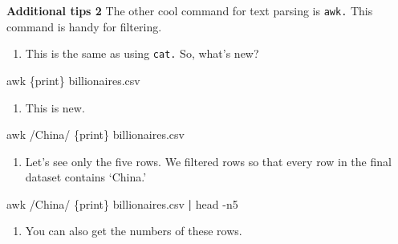 \documentclass[
]{book}
\newenvironment{Shaded}{\begin{snugshade}}{\end{snugshade}}
\newcommand{\FunctionTok}[1]{\textcolor[rgb]{0.00,0.00,0.00}{#1}}
\newcommand{\KeywordTok}[1]{\textcolor[rgb]{0.13,0.29,0.53}{\textbf{#1}}}
\newcommand{\NormalTok}[1]{#1}
\newcommand{\StringTok}[1]{\textcolor[rgb]{0.31,0.60,0.02}{#1}}
\providecommand{\tightlist}{%
  \setlength{\itemsep}{0pt}\setlength{\parskip}{0pt}}
\begin{document}
\textbf{Additional tips 2}
The other cool command for text parsing is \texttt{awk.} This command is handy for filtering.

\begin{enumerate}
\def\labelenumi{\arabic{enumi}.}
\tightlist
\item
  This is the same as using \texttt{cat.} So, what's new?
\end{enumerate}

\begin{Shaded}
\begin{Highlighting}[]
\FunctionTok{awk} \StringTok{\textquotesingle{}\{print\}\textquotesingle{}}\NormalTok{ billionaires.csv }
\end{Highlighting}
\end{Shaded}

\begin{enumerate}
\def\labelenumi{\arabic{enumi}.}
\setcounter{enumi}{1}
\tightlist
\item
  This is new.
\end{enumerate}

\begin{Shaded}
\begin{Highlighting}[]
\FunctionTok{awk} \StringTok{\textquotesingle{}/China/ \{print\}\textquotesingle{}}\NormalTok{ billionaires.csv}
\end{Highlighting}
\end{Shaded}

\begin{enumerate}
\def\labelenumi{\arabic{enumi}.}
\setcounter{enumi}{2}
\tightlist
\item
  Let's see only the five rows. We filtered rows so that every row in the final dataset contains `China.'
\end{enumerate}

\begin{Shaded}
\begin{Highlighting}[]
\FunctionTok{awk} \StringTok{\textquotesingle{}/China/ \{print\}\textquotesingle{}}\NormalTok{ billionaires.csv }\KeywordTok{|} \FunctionTok{head}\NormalTok{ {-}n5 }
\end{Highlighting}
\end{Shaded}

\begin{enumerate}
\def\labelenumi{\arabic{enumi}.}
\setcounter{enumi}{3}
\tightlist
\item
  You can also get the numbers of these rows.
\end{enumerate}
\end{document}
